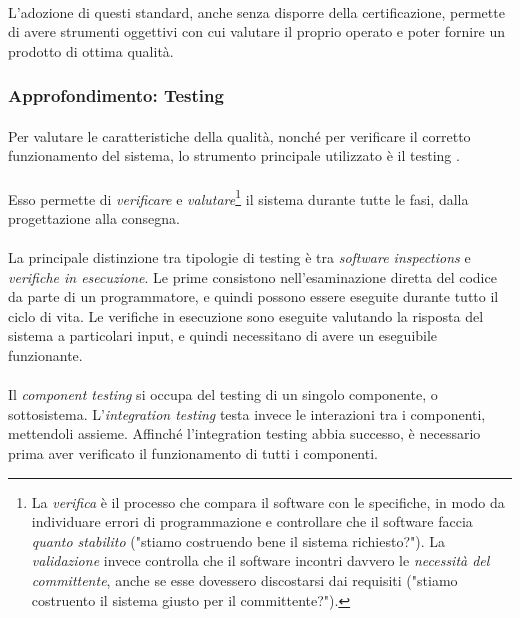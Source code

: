 \documentclass[11pt,a4paper,english]{article}
\begin{document}
\paragraph{} L'adozione di questi standard, anche senza disporre della certificazione, permette di avere strumenti oggettivi con cui valutare il proprio operato e poter fornire un prodotto di ottima qualità.


\subsubsection{Approfondimento: Testing}

\paragraph{} Per valutare le caratteristiche della qualità, nonché per verificare il corretto funzionamento del sistema, lo strumento principale utilizzato è il testing \cite{testing}. 

\paragraph{} Esso permette di \emph{verificare} e \emph{valutare}\footnote{La \emph{verifica} è il processo che compara il software con le specifiche, in modo da individuare errori di programmazione e controllare che il software faccia \emph{quanto stabilito} ("stiamo costruendo bene il sistema richiesto?"). La \emph{validazione} invece controlla che il software incontri davvero le \emph{necessità del committente}, anche se esse dovessero discostarsi dai requisiti ("stiamo costruento il sistema giusto per il committente?").} il sistema durante tutte le fasi, dalla progettazione alla consegna. 

\paragraph{} La principale distinzione tra tipologie di testing è tra \emph{software inspections} e \emph{verifiche in esecuzione}. Le prime consistono nell'esaminazione diretta del codice da parte di un programmatore, e quindi possono essere eseguite durante tutto il ciclo di vita. Le verifiche in esecuzione sono eseguite valutando la risposta del sistema a particolari input, e quindi necessitano di avere un eseguibile funzionante.

\paragraph{} Il \emph{component testing} si occupa del testing di un singolo componente, o sottosistema. L'\emph{integration testing} testa invece le interazioni tra i componenti, mettendoli assieme. Affinché l'integration testing abbia successo, è necessario prima aver verificato il funzionamento di tutti i componenti. 
\end{document}
